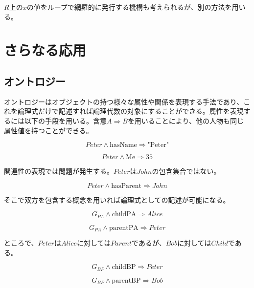 \documentclass[12pt]{article}
\begin{document}
\(R\)上の\(x\)の値をループで網羅的に発行する機構も考えられるが、別の方法を用いる。

\clearpage
\section{さらなる応用}\label{ux3055ux3089ux306aux308bux5fdcux7528}

\subsection{オントロジー}\label{ux30aaux30f3ux30c8ux30edux30b8ux30fc}

オントロジーはオブジェクトの持つ様々な属性や関係を表現する手法であり、これを論理式だけで記述すれば論理代数の対象にすることができる。属性を表現するには以下の手段を用いる。含意\(A\Rightarrow B\)を用いることにより、他の人物も同じ属性値を持つことができる。

\begin{equation} Peter \wedge \text{hasName} \Rightarrow \text{"Peter"}\end{equation}

\begin{equation} Peter \wedge \text{Me} \Rightarrow \text{35}\end{equation}

関連性の表現では問題が発生する。\(Peter\)は\(John\)の包含集合ではない。

\begin{equation} Peter \wedge \text{hasParent} \Rightarrow John\end{equation}

そこで双方を包含する概念を用いれば論理式としての記述が可能になる。

\begin{equation} G_{PA} \wedge \text{childPA} \Rightarrow Alice \end{equation}

\begin{equation} G_{PA} \wedge \text{parentPA} \Rightarrow Peter \end{equation}

ところで、\(Peter\)は\(Alice\)に対しては\(Parent\)であるが、\(Bob\)に対しては\(Child\)である。

\begin{equation} G_{BP} \wedge \text{childBP} \Rightarrow Peter \end{equation}

\begin{equation} G_{BP} \wedge \text{parentBP} \Rightarrow Bob \end{equation}
\end{document}
